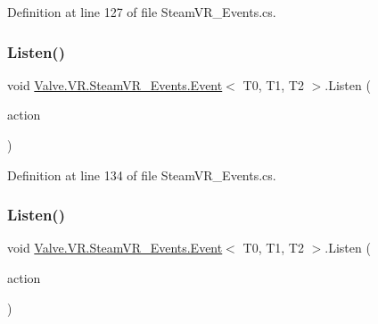Definition at line 127 of file Steam\+V\+R\+\_\+\+Events.\+cs.

\mbox{\label{class_valve_1_1_v_r_1_1_steam_v_r___events_1_1_event_afd37f17cf60ce691ed4841bf530148d3}} 
\subsubsection{\texorpdfstring{Listen()}{Listen()}\hspace{0.1cm}{\footnotesize\ttfamily [3/4]}}
{\footnotesize\ttfamily void \mbox{\hyperlink{class_valve_1_1_v_r_1_1_steam_v_r___events_1_1_event}{Valve.\+V\+R.\+Steam\+V\+R\+\_\+\+Events.\+Event}}$<$ T0, T1, T2 $>$.Listen (\begin{DoxyParamCaption}\item[{Unity\+Action$<$ T0, T1 $>$}]{action }\end{DoxyParamCaption})}



Definition at line 134 of file Steam\+V\+R\+\_\+\+Events.\+cs.

\mbox{\label{class_valve_1_1_v_r_1_1_steam_v_r___events_1_1_event_a5ef4a196ecb729036d38867c3350448a}} 
\subsubsection{\texorpdfstring{Listen()}{Listen()}\hspace{0.1cm}{\footnotesize\ttfamily [4/4]}}
{\footnotesize\ttfamily void \mbox{\hyperlink{class_valve_1_1_v_r_1_1_steam_v_r___events_1_1_event}{Valve.\+V\+R.\+Steam\+V\+R\+\_\+\+Events.\+Event}}$<$ T0, T1, T2 $>$.Listen (\begin{DoxyParamCaption}\item[{Unity\+Action$<$ T0, T1, T2 $>$}]{action }\end{DoxyParamCaption})}



